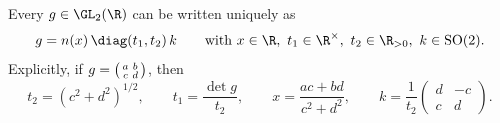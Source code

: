 Every $g\in\GL_2(\R)$ can be written uniquely as
\[
  g=n(x)\,\diag(t_1,t_2)\,k\qquad\text{with }x\in\R,\ t_1\in\R^\times,\ t_2\in\R_{>0},\ k\in\mathrm{SO}(2).
\]
Explicitly, if $g=\begin{psmallmatrix}a&b\\c&d\end{psmallmatrix}$, then
\[
  t_2=(c^2+d^2)^{1/2},\qquad t_1=\frac{\det g}{t_2},\qquad x=\frac{ac+bd}{c^2+d^2},\qquad
  k=\frac1{t_2}\begin{pmatrix}d&-c\\c&d\end{pmatrix}.
\]
